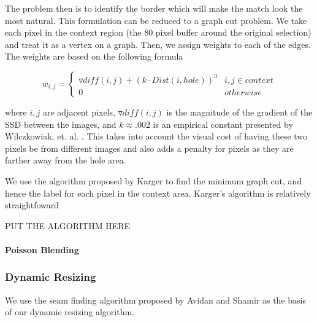 \documentclass[11pt]{amsart}
\begin{document}
The problem then is to identify the border which will make the match look the most natural. This formulation can be reduced to a graph cut problem. We take each pixel in the context region (the 80 pixel buffer around the original selection) and treat it as a vertex on a graph. Then, we assign weights to each of the edges. The weights are based on the following formula

\begin{displaymath}
	w_{i,j} = \left\{ 
		\begin{array}{lr}
			\triangledown diff(i,j) + (k \cdot Dist(i,hole))^3 &  i,j \in context \\
			0 &  otherwise
		\end{array}
	\right.
\end{displaymath}

where $i,j$ are adjacent pixels, $\triangledown diff(i,j)$ is the magnitude of the gradient of the SSD between the images, and $k \approx .002$ is an empirical constant presented by Wilczkowiak, et. al. \cite{Gabriel:2005}. This takes into account the visual cost of having these two pixels be from different images and also adds a penalty for pixels as they are farther away from the hole area.


We use the algorithm proposed by Karger \cite{Karger:1992} to find the minimum graph cut, and hence the label for each pixel in the context area. Karger's algorithm is relatively straightfoward


PUT THE ALGORITHM HERE

\paragraph{\sc Poisson Blending}

\subsubsection{Dynamic Resizing}

We use the seam finding algorithm proposed by Avidan and Shamir \cite{Avidan:2007} as the basis of our dynamic resizing algorithm. 
\end{document}
